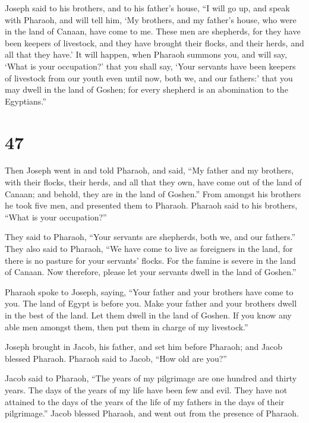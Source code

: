  Joseph said to his brothers, and to his father's house,
``I will go up, and speak with Pharaoh, and will tell him, `My brothers,
and my father's house, who were in the land of Canaan, have come to me.
 These men are shepherds, for they have been keepers of
livestock, and they have brought their flocks, and their herds, and all
that they have.'  It will happen, when Pharaoh summons you,
and will say, `What is your occupation?'  that you shall
say, `Your servants have been keepers of livestock from our youth even
until now, both we, and our fathers:' that you may dwell in the land of
Goshen; for every shepherd is an abomination to the Egyptians.''

\hypertarget{section-46}{%
\section{47}\label{section-46}}

 Then Joseph went in and told Pharaoh, and said, ``My father
and my brothers, with their flocks, their herds, and all that they own,
have come out of the land of Canaan; and behold, they are in the land of
Goshen.''  From amongst his brothers he took five men, and
presented them to Pharaoh.  Pharaoh said to his brothers,
``What is your occupation?''

They said to Pharaoh, ``Your servants are shepherds, both we, and our
fathers.''  They also said to Pharaoh, ``We have come to
live as foreigners in the land, for there is no pasture for your
servants' flocks. For the famine is severe in the land of Canaan. Now
therefore, please let your servants dwell in the land of Goshen.''

 Pharaoh spoke to Joseph, saying, ``Your father and your
brothers have come to you.  The land of Egypt is before you.
Make your father and your brothers dwell in the best of the land. Let
them dwell in the land of Goshen. If you know any able men amongst them,
then put them in charge of my livestock.''

 Joseph brought in Jacob, his father, and set him before
Pharaoh; and Jacob blessed Pharaoh.  Pharaoh said to Jacob,
``How old are you?''

 Jacob said to Pharaoh, ``The years of my pilgrimage are one
hundred and thirty years. The days of the years of my life have been few
and evil. They have not attained to the days of the years of the life of
my fathers in the days of their pilgrimage.''  Jacob
blessed Pharaoh, and went out from the presence of Pharaoh.

